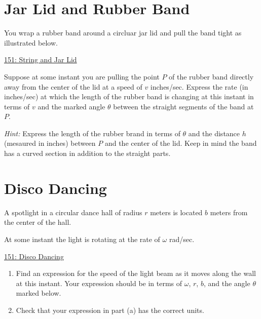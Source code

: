 \documentclass{ximera}
\begin{document}
\section{Jar Lid and Rubber Band}
\begin{question}  \label{Qbnmdfgh}
You wrap a rubber band around a circluar jar lid and pull the band tight as illustrated below.

 
\begin{onlineOnly}
   \begin{center}
\end{center}
\end{onlineOnly}

\href{https://www.desmos.com/calculator/jbku3wrtdq}{151: String and Jar Lid}

Suppose at some instant you are pulling the point $P$ of the rubber band directly away from the center of the lid at a speed of $v$ inches/sec. Express the rate (in inches/sec) at which the length of the rubber band is changing at this instant in terms of $v$ and the marked angle $\theta$ between the straight segments of the band at $P$.

\emph{Hint:} Express the length of the rubber brand in terms of $\theta$ and the distance $h$ (mesaured in inches) between $P$ and the center of the lid. Keep in mind the band has a curved section in addition to the straight parts.
\end{question}

\section{Disco Dancing}
\begin{question}
A spotlight in a circular dance hall of radius $r$ meters is located $b$ meters from the center of the hall. 

At some instant the light is rotating at the rate of $\omega$ rad/sec. 

\begin{onlineOnly}
   \begin{center}
\end{center}
\end{onlineOnly}

\href{https://www.desmos.com/calculator/m2o267u9ur}{151: Disco Dancing}


\begin{enumerate}
\item Find an expression for the speed of the light beam as it moves along the wall at this instant. Your expression should be in terms of $\omega$, $r$, $b$, and the angle $\theta$ marked below.

\item Check that your expression in  part (a) has the correct units.

\end{enumerate}

\end{question}
\end{document}
